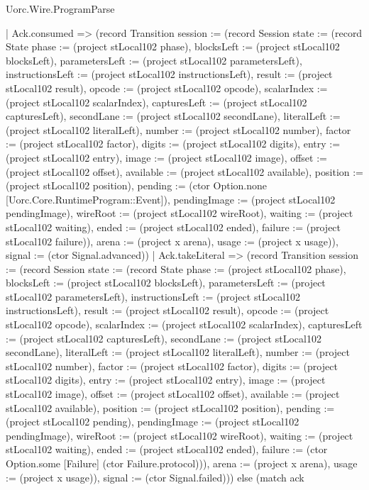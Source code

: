 \begin{lexlean}{Uorc.Wire.ProgramParse}
\begin{semanticmodule}
{        | Ack.consumed => (record Transition {session := (record Session {state := (record State {phase := (project stLocal102 phase), blocksLeft := (project stLocal102 blocksLeft), parametersLeft := (project stLocal102 parametersLeft), instructionsLeft := (project stLocal102 instructionsLeft), result := (project stLocal102 result), opcode := (project stLocal102 opcode), scalarIndex := (project stLocal102 scalarIndex), capturesLeft := (project stLocal102 capturesLeft), secondLane := (project stLocal102 secondLane), literalLeft := (project stLocal102 literalLeft), number := (project stLocal102 number), factor := (project stLocal102 factor), digits := (project stLocal102 digits), entry := (project stLocal102 entry), image := (project stLocal102 image), offset := (project stLocal102 offset), available := (project stLocal102 available), position := (project stLocal102 position), pending := (ctor Option.none [Uorc.Core.RuntimeProgram::Event]), pendingImage := (project stLocal102 pendingImage), wireRoot := (project stLocal102 wireRoot), waiting := (project stLocal102 waiting), ended := (project stLocal102 ended), failure := (project stLocal102 failure)}), arena := (project x arena), usage := (project x usage)}), signal := (ctor Signal.advanced)})
        | Ack.takeLiteral => (record Transition {session := (record Session {state := (record State {phase := (project stLocal102 phase), blocksLeft := (project stLocal102 blocksLeft), parametersLeft := (project stLocal102 parametersLeft), instructionsLeft := (project stLocal102 instructionsLeft), result := (project stLocal102 result), opcode := (project stLocal102 opcode), scalarIndex := (project stLocal102 scalarIndex), capturesLeft := (project stLocal102 capturesLeft), secondLane := (project stLocal102 secondLane), literalLeft := (project stLocal102 literalLeft), number := (project stLocal102 number), factor := (project stLocal102 factor), digits := (project stLocal102 digits), entry := (project stLocal102 entry), image := (project stLocal102 image), offset := (project stLocal102 offset), available := (project stLocal102 available), position := (project stLocal102 position), pending := (project stLocal102 pending), pendingImage := (project stLocal102 pendingImage), wireRoot := (project stLocal102 wireRoot), waiting := (project stLocal102 waiting), ended := (project stLocal102 ended), failure := (ctor Option.some [Failure] (ctor Failure.protocol))}), arena := (project x arena), usage := (project x usage)}), signal := (ctor Signal.failed)})) else (match ack
}
\end{semanticmodule}
\end{lexlean}
